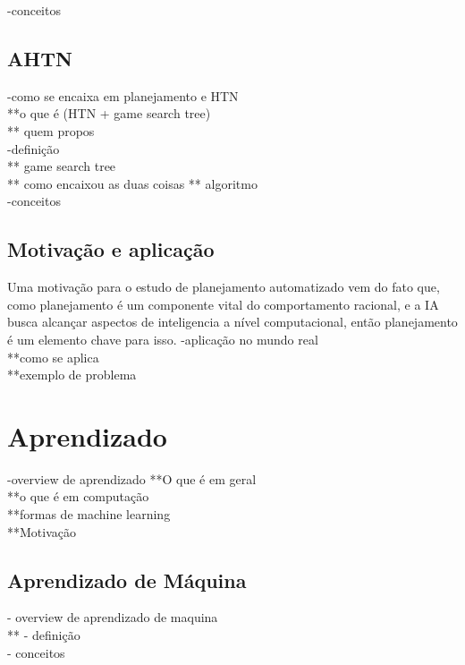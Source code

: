 -conceitos \\

\subsection{AHTN} 
-como se encaixa em planejamento e HTN \\
**o que é (HTN + game search tree)\\
** quem propos\cite{ontanon2015adversarial} \\
-definição \\
** game search tree \\
** como encaixou as duas coisas
** algoritmo \\
-conceitos  \\

\subsection{Motivação e aplicação}
Uma motivação para o estudo de planejamento automatizado vem do fato que, como planejamento é um componente vital do comportamento racional, e a IA busca alcançar aspectos de inteligencia a nível computacional, então planejamento é um elemento chave para isso\cite{ghallab2004automated}.
-aplicação no mundo real\\
**como se aplica \\
**exemplo de problema \\

\section{Aprendizado} 
-overview de aprendizado
**O que é em geral \\
**o que é em computação \\
**formas de machine learning\\
**Motivação \\

\subsection{Aprendizado de Máquina} 
- overview de aprendizado de maquina \\
**
- definição \\
- conceitos

